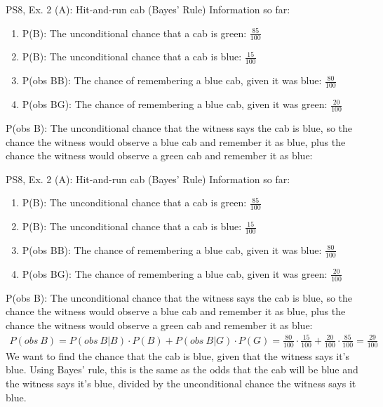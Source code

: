 \begin{frame}{PS8, Ex. 2 (A): Hit-and-run cab (Bayes' Rule)}
    Information so far:
    \begin{enumerate}
        \item P(B): The unconditional chance that a cab is green: $\frac{85}{100}$
        \item P(B): The unconditional chance that a cab is blue: $\frac{15}{100}$
        \item P(obs B\textbar B): The chance of remembering a blue cab, given it was blue: $\frac{80}{100}$
        \item P(obs B\textbar G): The chance of remembering a blue cab, given it was green: $\frac{20}{100}$
    \end{enumerate}
    P(obs B): The unconditional chance that the witness says the cab is blue, so the chance the witness would observe a blue cab and remember it as blue, plus the chance the witness would observe a green cab and remember it as blue:
    \vfill\null
\end{frame}

\begin{frame}{PS8, Ex. 2 (A): Hit-and-run cab (Bayes' Rule)}
    Information so far:
    \begin{enumerate}
        \item P(B): The unconditional chance that a cab is green: $\frac{85}{100}$
        \item P(B): The unconditional chance that a cab is blue: $\frac{15}{100}$
        \item P(obs B\textbar B): The chance of remembering a blue cab, given it was blue: $\frac{80}{100}$
        \item P(obs B\textbar G): The chance of remembering a blue cab, given it was green: $\frac{20}{100}$
    \end{enumerate}
    P(obs B): The unconditional chance that the witness says the cab is blue, so the chance the witness would observe a blue cab and remember it as blue, plus the chance the witness would observe a green cab and remember it as blue:
    \begin{align*}
        P(obs\ B)=P(obs\ B|B)\cdot P(B)+P(obs\ B|G)\cdot P(G)=\frac{80}{100}\cdot\frac{15}{100}+\frac{20}{100}\cdot\frac{85}{100}=\frac{29}{100}
    \end{align*}
    We want to find the chance that the cab is blue, given that the witness says it's blue. Using Bayes' rule, this is the same as the odds that the cab will be blue and the witness says it's blue, divided by the unconditional chance the witness says it blue.
    \vfill\null
\end{frame}

